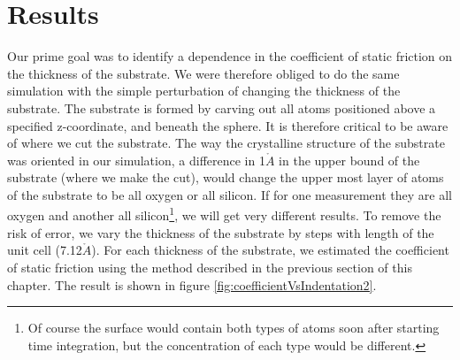 \documentclass[twoside,english]{uiofysmaster}
\begin{document}
\section{Results}
Our prime goal was to identify a dependence in the coefficient of static friction on the thickness of the substrate. 
We were therefore obliged to do the same simulation with the simple perturbation of changing the thickness of the substrate. 
The substrate is formed by carving out all atoms positioned above a specified z-coordinate, and beneath the sphere. 
It is therefore critical to be aware of where we cut the substrate. 
The way the crystalline structure of the substrate was oriented in our simulation, a difference in 1$\mathring{A}$ in the upper bound of the substrate (where we make the cut), would change the upper most layer of atoms of the substrate to be all oxygen or all silicon.
If for one measurement they are all oxygen and another all silicon\footnote{Of course the surface would contain both types of atoms soon after starting time integration, but the concentration of each type would be different.}, we will get very different results. 
To remove the risk of error, we vary the thickness of the substrate by steps with length of the unit cell (7.12$\mathring{A}$).
For each thickness of the substrate, we estimated the coefficient of static friction using the method described in the previous section of this chapter.
The result is shown in figure \ref{fig:coefficientVsIndentation2}.


\end{document}

